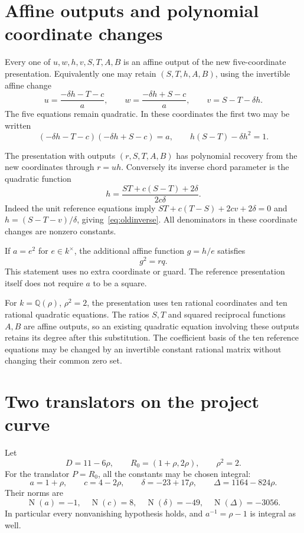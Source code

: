 \documentclass[11pt,a4paper]{article}
\newcommand{\Q}{\mathbb Q}
\DeclareMathOperator{\N}{N}
\begin{document}
\section{Affine outputs and polynomial coordinate changes}
Every one of $u,w,h,v,S,T,A,B$ is an affine output of the new
five-coordinate presentation. Equivalently one may retain
$(S,T,h,A,B)$, using the invertible affine change
\begin{equation}\label{eq:STchange}
 u=\frac{-\delta h-T-c}{a},\qquad
 w=\frac{-\delta h+S-c}{a},\qquad
 v=S-T-\delta h.
\end{equation}
The five equations remain quadratic. In these coordinates the first
two may be written
\[
 (-\delta h-T-c)(-\delta h+S-c)=a,
 \qquad h(S-T)-\delta h^2=1.
\]

The presentation with outputs $(r,S,T,A,B)$ has polynomial recovery
from the new coordinates through $r=uh$. Conversely its inverse
chord parameter is the quadratic function
\begin{equation}\label{eq:oldinverse}
                  h=\frac{ST+c(S-T)+2\delta}{2c\delta}.
\end{equation}
Indeed the unit reference equations imply
$ST+c(T-S)+2cv+2\delta=0$ and
$h=(S-T-v)/\delta$, giving~\eqref{eq:oldinverse}.
All denominators in these coordinate changes are nonzero constants.

If $a=e^2$ for $e\in k^\times$, the additional affine function
$g=h/e$ satisfies
\[
                              g^2=rq.
\]
This statement uses no extra coordinate or guard. The reference
presentation itself does not require $a$ to be a square.

For $k=\Q(\rho)$, $\rho^2=2$, the presentation uses ten rational
coordinates and ten rational quadratic equations. The ratios $S,T$
and squared reciprocal functions $A,B$ are affine outputs, so an
existing quadratic equation involving these outputs retains its
degree after this substitution. The coefficient basis of the ten
reference equations may be changed by an invertible constant rational
matrix without changing their common zero set.

\section{Two translators on the project curve}
Let
\[
 D=11-6\rho,\qquad R_0=(1+\rho,2\rho),\qquad\rho^2=2.
\]
For the translator $P=R_0$, all the constants may be chosen integral:
\begin{equation}\label{eq:R0}
 a=1+\rho,\qquad c=4-2\rho,\qquad
 \delta=-23+17\rho,\qquad\Delta=1164-824\rho.
\end{equation}
Their norms are
\[
              \N(a)=-1,\quad\N(c)=8,\quad
              \N(\delta)=-49,\quad\N(\Delta)=-3056.
\]
In particular every nonvanishing hypothesis holds, and
$a^{-1}=\rho-1$ is integral as well.
\end{document}
